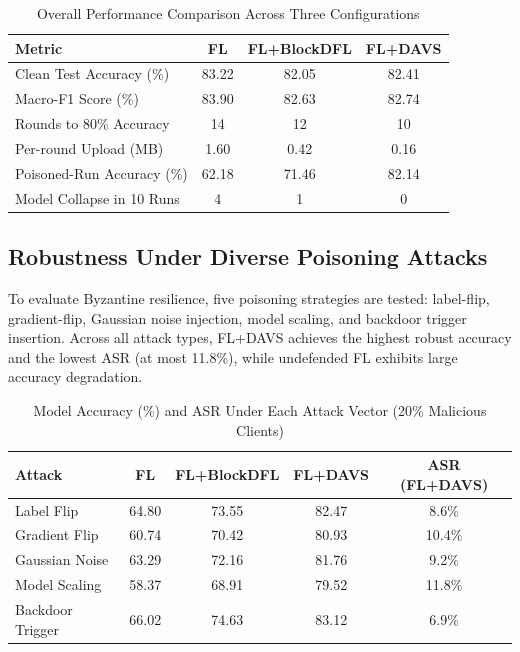 \begin{table}[h]
\centering
\caption{Overall Performance Comparison Across Three Configurations}
\begin{tabular}{|l|c|c|c|}
\hline
\textbf{Metric} & \textbf{FL} & \textbf{FL+BlockDFL} & \textbf{FL+DAVS} \\
\hline
Clean Test Accuracy (\%) & 83.22 & 82.05 & 82.41 \\
Macro-F1 Score (\%) & 83.90 & 82.63 & 82.74 \\
Rounds to 80\% Accuracy & 14 & 12 & 10 \\
Per-round Upload (MB) & 1.60 & 0.42 & 0.16 \\
Poisoned-Run Accuracy (\%) & 62.18 & 71.46 & 82.14 \\
Model Collapse in 10 Runs & 4 & 1 & 0 \\
\hline
\end{tabular}
\label{tab:primary_compare_ch8}
\end{table}

\subsection{Robustness Under Diverse Poisoning Attacks}
To evaluate Byzantine resilience, five poisoning strategies are tested: label-flip, gradient-flip, Gaussian noise injection, model scaling, and backdoor trigger insertion. Across all attack types, FL+DAVS achieves the highest robust accuracy and the lowest ASR (at most 11.8\%), while undefended FL exhibits large accuracy degradation.

\begin{table}[h]
\centering
\caption{Model Accuracy (\%) and ASR Under Each Attack Vector (20\% Malicious Clients)}
\begin{tabular}{|l|c|c|c|c|}
\hline
\textbf{Attack} & \textbf{FL} & \textbf{FL+BlockDFL} & \textbf{FL+DAVS} & \textbf{ASR (FL+DAVS)} \\
\hline
Label Flip & 64.80 & 73.55 & 82.47 & 8.6\% \\
Gradient Flip & 60.74 & 70.42 & 80.93 & 10.4\% \\
Gaussian Noise & 63.29 & 72.16 & 81.76 & 9.2\% \\
Model Scaling & 58.37 & 68.91 & 79.52 & 11.8\% \\
Backdoor Trigger & 66.02 & 74.63 & 83.12 & 6.9\% \\
\hline
\end{tabular}
\label{tab:attack_20_ch8}
\end{table}

